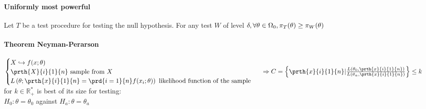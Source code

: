 \paragraph{Uniformly most powerful} 
Let $T$ be a test procedure for testing the null hypothesis.
For any test $W$ of level $\delta,\\ \forall\theta\in\Omega_{0}, \pi_{T}(\theta)\geq\pi_{W}(\theta)$ 

\paragraph{Theorem Neyman-Perarson}
$
\begin{cases}
	X\hookrightarrow f(x;\theta)\\
	\prth{X}{i}{1}{n}\text{ sample from }X\\
	L\left(\theta;\prth{x}{i}{1}{n}=\prd{{i=1}}{n}f(x_{i};\theta)\right)\text{ likelihood function of the sample }
\end{cases}\\
\Rightarrow
C=\left\{\prth{x}{i}{1}{n}|\frac{L\left(\theta_{0},\prth{x}{i}{1}{n}\right)}{L\left(\theta_{\alpha},\prth{x}{i}{1}{n}\right)}\right\}\leq k
$ for $k\in\mathbb{R}_{+}^{*}$ is best of its size for testing:\\
$H_{0}: \theta = \theta_{0}$ against $H_{a}:\theta = \theta_{a}$
